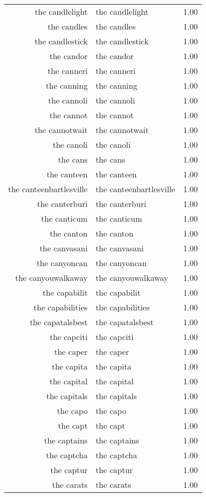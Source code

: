 \begin{table}[ht]
\begin{tabular}{rlr}
  the candlelight & the candlelight & 1.00 \\ 
  the candles & the candles & 1.00 \\ 
  the candlestick & the candlestick & 1.00 \\ 
  the candor & the candor & 1.00 \\ 
  the canneri & the canneri & 1.00 \\ 
  the canning & the canning & 1.00 \\ 
  the cannoli & the cannoli & 1.00 \\ 
  the cannot & the cannot & 1.00 \\ 
  the cannotwait & the cannotwait & 1.00 \\ 
  the canoli & the canoli & 1.00 \\ 
  the cans & the cans & 1.00 \\ 
  the canteen & the canteen & 1.00 \\ 
  the canteenbartlesville & the canteenbartlesville & 1.00 \\ 
  the canterburi & the canterburi & 1.00 \\ 
  the canticum & the canticum & 1.00 \\ 
  the canton & the canton & 1.00 \\ 
  the canvasani & the canvasani & 1.00 \\ 
  the canyoncan & the canyoncan & 1.00 \\ 
  the canyouwalkaway & the canyouwalkaway & 1.00 \\ 
  the capabilit & the capabilit & 1.00 \\ 
  the capabilities & the capabilities & 1.00 \\ 
  the capatalsbest & the capatalsbest & 1.00 \\ 
  the capciti & the capciti & 1.00 \\ 
  the caper & the caper & 1.00 \\ 
  the capita & the capita & 1.00 \\ 
  the capital & the capital & 1.00 \\ 
  the capitals & the capitals & 1.00 \\ 
  the capo & the capo & 1.00 \\ 
  the capt & the capt & 1.00 \\ 
  the captains & the captains & 1.00 \\ 
  the captcha & the captcha & 1.00 \\ 
  the captur & the captur & 1.00 \\ 
  the carats & the carats & 1.00 \\ 

\end{tabular}
\end{table}
